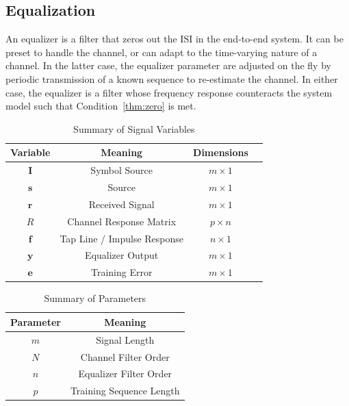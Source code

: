 \documentclass[]{article}
\begin{document}
\subsection{Equalization}
\label{sec:equal}
An equalizer is a filter that zeros out the ISI in the end-to-end system.  It can be preset to handle the channel, or can adapt to the time-varying nature of a channel.  In the latter case, the equalizer parameter are adjusted on the fly by periodic transmission of a known sequence to re-estimate the channel.  In either case, the equalizer is a filter whose frequency response counteracts the system model such that Condition~\ref{thm:zero} is met. 

\begin{table}[H]
\begin{center}
\begin{tabular}{|c|c|c|c|}
\hline Variable & Meaning & Dimensions \\
\hline \hline
$\mathbf{I}$ & Symbol Source & $ m \times 1$ \\ \hline
$\mathbf{s}$ & Source & $m\times 1 $\\ \hline
$\mathbf{r}$ & Received Signal & $m\times 1$ \\ \hline
$R$ & Channel Response Matrix & $p\times n$ \\ \hline
$\mathbf{f}$ & Tap Line / Impulse Response & $n\times 1 $ \\ \hline
$\mathbf{y}$ & Equalizer Output & $ m\times 1 $ \\ \hline
 $\mathbf{e}$ & Training Error & $ m\times 1 $ \\ \hline
\end{tabular}
\caption{Summary of Signal Variables} \label{tab:filtersummary}
\end{center}
\end{table}

\begin{table}[b]
\begin{center}
\begin{tabular}{|c|c|}
\hline Parameter & Meaning \\
\hline \hline
$m$ & Signal Length \\ \hline
$N$ & Channel Filter Order \\ \hline
$n$ & Equalizer Filter Order \\ \hline
$p$ & Training Sequence Length \\ \hline
\end{tabular}
\caption{Summary of Parameters} \label{tab:Paramsummary}
\end{center}
\end{table}
\end{document}
